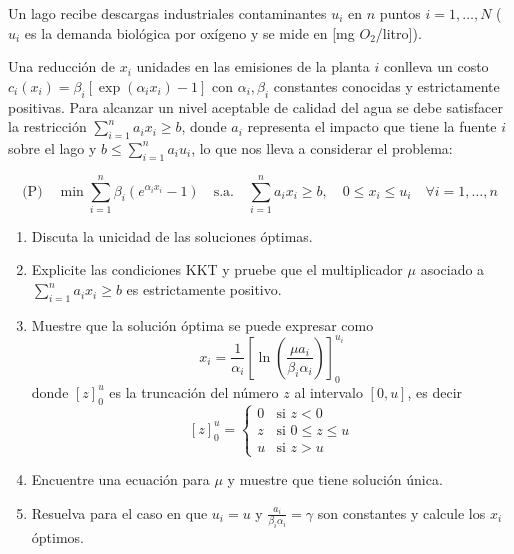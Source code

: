 Un lago recibe descargas industriales contaminantes $u_i$ en $n$ puntos $i = 1, \dots, N$ ($u_i$ es la demanda biológica por oxígeno y se mide en [mg $O_2$/litro]).

Una reducción de $x_i$ unidades en las emisiones de la planta $i$ conlleva un costo $c_i(x_i) = \beta_i [\exp(\alpha_i x_i) - 1]$ con $\alpha_i, \beta_i$ constantes conocidas y estrictamente positivas. Para alcanzar un nivel aceptable de calidad del agua se debe satisfacer la restricción $\sum_{i=1}^{n} a_i x_i \geq b$, donde $a_i$ representa el impacto que tiene la fuente $i$ sobre el lago y $b \leq \sum_{i=1}^{n} a_i u_i$, lo que nos lleva a considerar el problema:

\[
\text{(P)} \quad \min \sum_{i=1}^{n} \beta_i (e^{\alpha_i x_i} - 1)
\quad \text{s.a.} \quad
\sum_{i=1}^{n} a_i x_i \geq b, \quad
0 \leq x_i \leq u_i \quad \forall i = 1, \dots, n
\]
\begin{enumerate}
  \item[(a)] Discuta la unicidad de las soluciones óptimas.
  \item[(b)] Explicite las condiciones KKT y pruebe que el multiplicador $\mu$ asociado a $\sum_{i=1}^{n} a_i x_i \geq b$ es estrictamente positivo.
  \item[(c)] Muestre que la solución óptima se puede expresar como 
  \[
  x_i = \frac{1}{\alpha_i} \left[ \ln\left( \frac{\mu a_i}{\beta_i \alpha_i} \right) \right]_{0}^{u_i}
  \]
  donde $[z]_0^u$ es la truncación del número $z$ al intervalo $[0, u]$, es decir
  \[
  [z]_0^u =
  \begin{cases}
  0 & \text{si } z < 0 \\
  z & \text{si } 0 \leq z \leq u \\
  u & \text{si } z > u
  \end{cases}
  \]
  \item[(d)] Encuentre una ecuación para $\mu$ y muestre que tiene solución única.
  \item[(e)] Resuelva para el caso en que $u_i = u$ y $\frac{a_i}{\beta_i \alpha_i} = \gamma$ son constantes y calcule los $x_i$ óptimos.
\end{enumerate}
